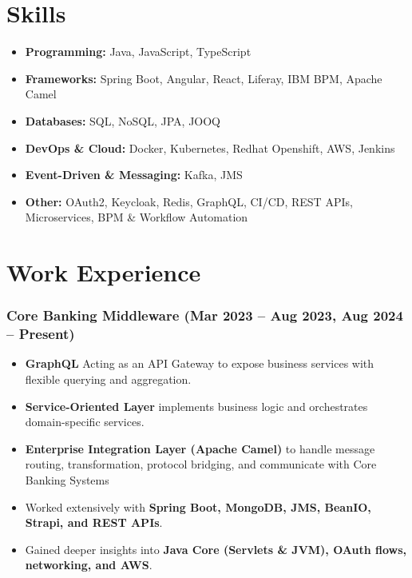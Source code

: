 \documentclass[a4paper,11pt]{article}
\begin{document}
{\section*{{\faStar} Skills}
\begin{itemize}
    \item \textbf{Programming:} Java, JavaScript, TypeScript
    \item \textbf{Frameworks:} Spring Boot, Angular, React, Liferay, IBM BPM, Apache Camel
    \item \textbf{Databases:} SQL, NoSQL, JPA, JOOQ
    \item \textbf{DevOps \& Cloud:} Docker, Kubernetes, Redhat Openshift, AWS, Jenkins
    \item \textbf{Event-Driven \& Messaging:} Kafka, JMS
    \item \textbf{Other:} OAuth2, Keycloak, Redis, GraphQL, CI/CD, REST APIs, Microservices, BPM \& Workflow Automation
\end{itemize}

\section*{{\faBriefcase} Work Experience}

\subsubsection*{Core Banking Middleware (Mar 2023 – Aug 2023, Aug 2024 – Present)}
\begin{itemize}
\item \textbf{GraphQL} Acting as an API Gateway to  expose business services with flexible querying and aggregation.
\item \textbf{Service-Oriented Layer} implements business logic and orchestrates domain-specific services.
\item \textbf{Enterprise Integration Layer (Apache Camel)} to handle message routing, transformation, protocol bridging, and communicate with Core Banking Systems

    \item Worked extensively with \textbf{Spring Boot, MongoDB, JMS, BeanIO, Strapi, and REST APIs}.
    \item Gained deeper insights into \textbf{Java Core (Servlets \& JVM), OAuth flows, networking, and AWS}.
\end{itemize}

}
\end{document}
